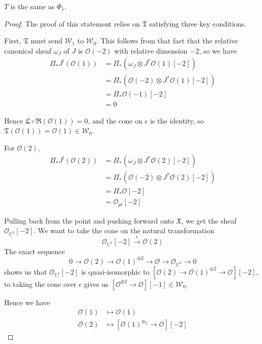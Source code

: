 \begin{theorem}{\cite*{donovan_window_2014}}{}
	 $T$ is the same as $\Phi_1$. 
\end{theorem}

\begin{proof}
	
The proof of this statement relies on $\mathfrak{T}$ satisfying three key conditions. 

First, $\mathfrak{T}$ must send $\mathcal{W}_1$ to $\mathcal{W}_{0}$. This follows from that fact that the relative canonical sheaf $\omega_J$ of $J$ is $\mathcal{O}(-2)$ with relative dimension $-2$, so we have 
\begin{align*}
\Pi_{*}J^{!}(\mathcal{O}(1)) &= \Pi_{*}\left(\omega_{J}\otimes  J^{*} \mathcal{O}(1)[-2] \right) \\
&= \Pi_{*}\left( \mathcal{O}(-2)\otimes  J^{*}\mathcal{O}(1)[-2] \right) \\
&= \Pi_{*}\mathcal{O}(-1)[-2] \\
&=0  
\end{align*}

Hence $\mathfrak{L} \circ \mathfrak{R} (\mathcal{O}(1))=0$, and the cone on $\epsilon$ is the identity, so $\mathfrak{T}(\mathcal{O}(1)) = \mathcal{O}(1)\in \mathcal{W_0}$.

For $\mathcal{O}(2)$, 
\begin{align*}
\Pi_{*}J^{!}(\mathcal{O}(2)) &= \Pi_{*}\left(\omega_{J}\otimes  J^{*} \mathcal{O}(2)[-2] \right) \\
&= \Pi_{*}\left( \mathcal{O}(-2)\otimes  J^{*}\mathcal{O}(2)[-2] \right) \\
&= \Pi_{*}\mathcal{O}[-2] \\
&= \mathcal{O}_{pt}[-2]
\end{align*}

Pulling back from the point and pushing forward onto $\mathfrak{X}$, we get the sheaf $\mathcal{O}_{\mathbb{C}^{2}}[-2]$. We want to take the cone on the natural transformation $$
\mathcal{O}_{\mathbb{C}^2}[-2]\xrightarrow{\epsilon} \mathcal{O}(2)
$$ The exact sequence $$
0 \to \mathcal{O}(2)\to \mathcal{O}(1) ^{\oplus 2} \to \mathcal{O} \to \mathcal{O}_{\mathbb{C}^{2}}\to 0
$$ shows us that $\mathcal{O}_{\mathbb{C}^2}[-2]$ is quasi-isomorphic to $\left[ \mathcal{O}(2)\to \mathcal{O}(1)^{\oplus{2}}\to \mathcal{O} \right][-2]$, to taking the cone over $\epsilon$ gives us $\left[ \mathcal{O}^{\oplus{2}}\to \mathcal{O} \right][-1] \in \mathcal{W}_0.$

Hence we have 
\begin{align*}
\mathcal{O}(1) &\mapsto \mathcal{O}(1) \\
\mathcal{O}(2) &\mapsto \left[ \mathcal{O}(1)^{\oplus_{2}}\to \mathcal{O} \right][-2] 
\end{align*}


\end{proof}
